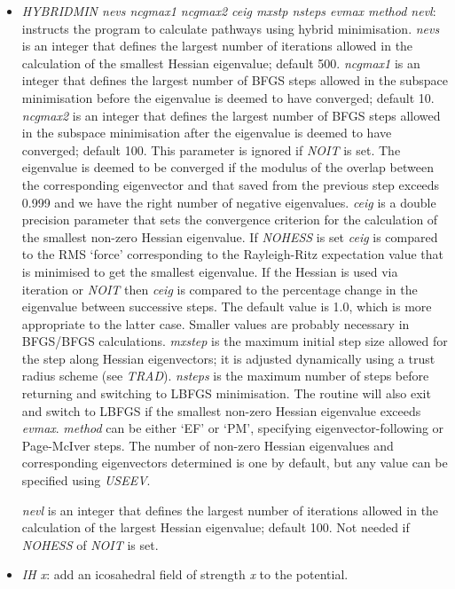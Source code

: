 \documentclass[12pt,a4paper,dvips]{article}
\begin{document}
\begin{itemize}
\item {\it HYBRIDMIN\/ nevs ncgmax1 ncgmax2 ceig mxstp nsteps evmax method nevl}: instructs the 
program to calculate pathways using hybrid minimisation.
{\it nevs\/} is an integer that defines the largest number of iterations allowed in the
calculation of the smallest Hessian eigenvalue; default 500.
{\it ncgmax1\/} is an integer that defines the largest number of BFGS steps
allowed in the subspace minimisation before the eigenvalue is deemed to have converged; default 10.
{\it ncgmax2\/} is an integer that defines the largest number of BFGS steps
allowed in the subspace minimisation after the eigenvalue is deemed to have converged; default 100.
This parameter is ignored if {\it NOIT\/} is set.
The eigenvalue is deemed to be converged if the modulus of the overlap between the corresponding
eigenvector and that saved from the previous step exceeds 0.999 and we have the right number of
negative eigenvalues.
{\it ceig\/} is a double precision parameter that sets the convergence criterion for
the calculation of the smallest non-zero Hessian eigenvalue.
If {\it NOHESS\/} is set {\it ceig\/} is compared to the RMS `force' corresponding to the
Rayleigh-Ritz expectation value that is minimised to get the smallest eigenvalue.
If the Hessian is used via iteration or {\it NOIT\/}
then {\it ceig\/} is compared to the percentage change in the eigenvalue between successive
steps. The default value is 1.0, which is more appropriate to the latter case. Smaller
values are probably necessary in BFGS/BFGS calculations.
{\it mxstep\/} is the maximum initial step size allowed for the step along
Hessian eigenvectors; it is adjusted dynamically using a trust radius scheme (see {\it TRAD\/}).
{\it nsteps\/} is the maximum number of steps before returning and switching to LBFGS
minimisation. 
The routine will also exit and switch to LBFGS if the smallest non-zero Hessian
eigenvalue exceeds {\it evmax\/}.
{\it method\/} can be either `EF' or `PM', specifying eigenvector-following or
Page-McIver steps.
The number of non-zero Hessian eigenvalues and corresponding eigenvectors determined
is one by default, but any value can be specified using {\it USEEV\/}.

{\it nevl\/} is an integer that defines the largest number of iterations allowed in the
calculation of the largest Hessian eigenvalue; default 100. Not needed if {\it NOHESS\/}
of {\it NOIT\/} is set. 

\item {\it IH x\/}: add an icosahedral field of strength {\it x} to the potential.


\end{itemize}
\end{document}
